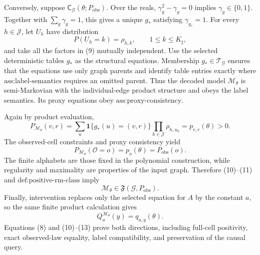 Conversely, suppose \(\mathsf C_{\mathcal G}(\theta;P_{\mathrm{obs}})\). Over the reals, \(\gamma_g^2-\gamma_g=0\) implies \(\gamma_g\in\{0,1\}\). Together with \(\sum_g\gamma_g=1\), this gives a unique \(g_*\) satisfying \(\gamma_{g_*}=1\). For every \(h\in\mathcal J\), let \(U_h\) have distribution
\[
P(U_h=k)=\rho_{h,k},
\qquad 1\leq k\leq K_{\sharp},
\tag{9}
\]
and take all the factors in (9) mutually independent. Use the selected deterministic tables \(g_*\) as the structural equations. Membership \(g_*\in\mathcal T_{\mathcal G}\) ensures that the equations use only graph parents and identify table entries exactly where \(\text{ass:label-semantics}\) requires an omitted parent. Thus the decoded model \(\mathcal M_\theta\) is semi-Markovian with the individual-edge product structure and obeys the label semantics. Its proxy equations obey \(\text{ass:proxy-consistency}\).

Again by product evaluation,
\[
P_{\mathcal M_\theta}(v,r)
=\sum_u\mathbf 1\{g_*(u)=(v,r)\}
\prod_{h\in\mathcal J}\rho_{h,u_h}
=p_{v,r}(\theta)>0.
\tag{10}
\]
The observed-cell constraints and proxy consistency yield
\[
P_{\mathcal M_\theta}(\mathcal O=o)
=p_o(\theta)=P_{\mathrm{obs}}(o).
\tag{11}
\]
The finite alphabets are those fixed in the polynomial construction, while regularity and maximality are properties of the input graph. Therefore (10)--(11) and \(\text{def:positive-rm-class}\) imply
\[
\mathcal M_\theta\in\mathfrak F(\mathcal G,P_{\mathrm{obs}}).
\tag{12}
\]
Finally, intervention replaces only the selected equation for \(A\) by the constant \(a\), so the same finite product calculation gives
\[
Q_a^{\mathcal M_\theta}(y)=q_{a,y}(\theta).
\tag{13}
\]
Equations (8) and (10)--(13) prove both directions, including full-cell positivity, exact observed-law equality, label compatibility, and preservation of the causal query.